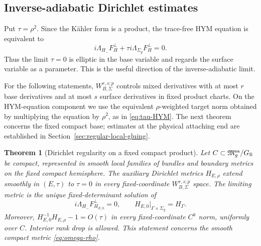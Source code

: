 \documentclass[11pt]{amsart}
\newtheorem{theorem}{Theorem}[section]
\theoremstyle{definition}
\theoremstyle{remark}
\theoremstyle{plain}
\newcommand{\RR}{\mathbb{R}}
\newcommand{\frakM}{\mathfrak{M}}
\begin{document}
\subsection{Inverse-adiabatic Dirichlet estimates}
\label{sec:uniform-inverse}
Put $\tau=\rho^2$.  Since the K\"ahler form is a product, the trace-free
HYM equation is equivalent to
\begin{equation}\label{eq:tau-HYM}
 i\Lambda_{H_-}F_H^\perp
       +\tau i\Lambda_{\Sigma_g}F_H^\perp=0.
\end{equation}
Thus the limit $\tau=0$ is elliptic in the base variable and regards the
surface variable as a parameter.  This is the useful direction of the
inverse-adiabatic limit.

For the following statements, $W^{r,s;p}_{B,\Sigma}$ controls mixed
derivatives with at most $r$ base derivatives and at most $s$ surface
derivatives in fixed product charts.  On the HYM-equation
component we use the equivalent $\rho$-weighted target norm obtained by
multiplying the equation by $\rho^2$, as in
\eqref{eq:tau-HYM}. The next theorem concerns the fixed compact base;
estimates at the physical attaching end are established in
Section~\ref{sec:regular-local-gluing}.

\begin{theorem}[Dirichlet regularity on a fixed compact product]
\label{thm:inverse-adiabatic}
Let $C\subset\frakM_g^{\rm sa}/G_\RR$ be compact, represented in smooth
local families of bundles and boundary metrics on the fixed compact
hemisphere. The auxiliary Dirichlet metrics $H_{E,\rho}$ extend smoothly
in $(E,\tau)$ to $\tau=0$ in every fixed-coordinate
$W^{r,s;p}_{B,\Sigma}$ space. The limiting metric is the unique
fixed-determinant solution of
\begin{equation}\label{eq:base-flat-limit}
 i\Lambda_{H_-}F_{H_{E,0}}^\perp=0,
 \qquad H_{E,0}|_{\Gamma\times\Sigma_g}=H_\Gamma.
\end{equation}
Moreover, $H_{E,0}^{-1}H_{E,\rho}-1=O(\tau)$ in every fixed-coordinate
$C^k$ norm, uniformly over $C$. Interior rank drop is allowed. This
statement concerns the smooth compact metric \eqref{eq:omega-rho}.
\end{theorem}
\end{document}
